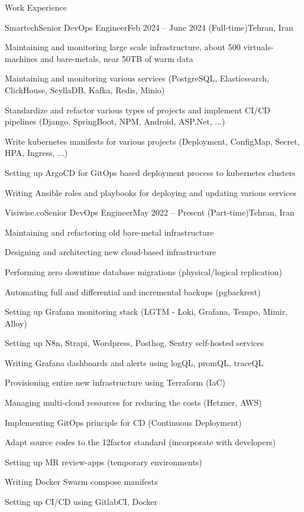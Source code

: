 \documentclass[]{main}
\begin{document}
\newpage

\begin{section}{Work Experience}
 \begin{subsection}{Smartech}{Senior DevOps Engineer}{Feb 2024 -- June 2024 (Full-time)}{Tehran, Iran}
     \item Maintaining and monitoring large scale infrastructure, about 500 virtuals-machines and bare-metals, near 50TB of warm data
     \item Maintaining and monitoring various services (PostgreSQL, Elasticsearch, ClickHouse, ScyllaDB, Kafka, Redis, Minio)
     \item Standardize and refactor various types of projects and implement CI/CD pipelines (Django, SpringBoot, NPM, Android, ASP.Net, ...)
     \item Write kubernetes manifests for various projects (Deployment, ConfigMap, Secret, HPA, Ingress, ...)
     \item Setting up ArgoCD for GitOps based deployment process to kubernetes clusters
     \item Writing Ansible roles and playbooks for deploying and updating various services
 \end{subsection}

 \begin{subsection}{Visiwise.co}{Senior DevOps Engineer}{May 2022 -- Present (Part-time)}{Tehran, Iran}
     \item Maintaining and refactoring old bare-metal infrastructure
     \item Designing and architecting new cloud-based infrastructure
     \item Performing zero downtime database migrations (physical/logical replication)
     \item Automating full and differential and incremental backups (pgbackrest)
     \item Setting up Grafana monitoring stack (LGTM - Loki, Grafana, Tempo, Mimir, Alloy)
     \item Setting up N8n, Strapi, Wordpress, Posthog, Sentry self-hosted services
     \item Writing Grafana dashboards and alerts using logQL, promQL, traceQL
     \item Provisioning entire new infrastructure using Terraform (IaC)
     \item Managing multi-cloud resources for reducing the costs (Hetzner, AWS)
     \item Implementing GitOps principle for CD (Continuous Deployment)
     \item Adapt source codes to the 12factor standard (incorporate with developers)
     \item Setting up MR review-apps (temporary environments)
     \item Writing Docker Swarm compose manifests
     \item Setting up CI/CD using GitlabCI, Docker
 \end{subsection}


\end{section}
\end{document}
